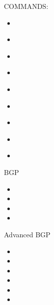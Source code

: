\documentclass{article}
\begin{document}
COMMANDS:
	\begin{itemize}
	\item 
	\end{itemize}

	\begin{itemize}
	\item 
	\end{itemize}

	\begin{itemize}
	\item 
	\end{itemize}

	\begin{itemize}
	\item 
	\end{itemize}

	\begin{itemize}
	\item 
	\end{itemize}

	\begin{itemize}
	\item 
	\end{itemize}

	\begin{itemize}
	\item 
	\end{itemize}

	\begin{itemize}
	\item 
	\end{itemize}

	\begin{itemize}
	\item 
	\end{itemize}

BGP
\begin{itemize}
	\item
	\item
	\item
	\item 
\end{itemize}

Advanced BGP
\begin{itemize}
	\item
	\item
	\item
	\item
	\item 
	\item 
\end{itemize}
\end{document}
